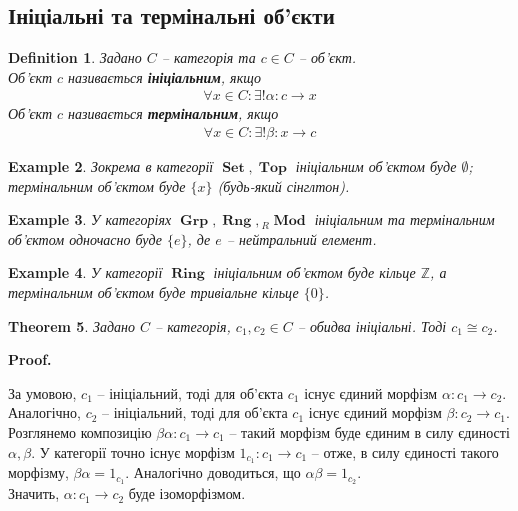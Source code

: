 \documentclass[a4paper, 10pt]{article}
\makeatletter
\theoremstyle{theoremdd}
\newtheorem{theorem}{Theorem}[subsection]
\newtheorem{definition}[theorem]{Definition}
\newtheorem{example}[theorem]{Example}
\renewenvironment{proof}[1][Proof.\\]{\par
\pushQED{\hfill \qed}%
\normalfont \topsep6\p@\@plus6\p@\relax
\trivlist
\item\relax
{\bfseries
#1\@addpunct{.}}\hspace\labelsep\ignorespaces
}{%
\popQED\endtrivlist\@endpefalse
}
\DeclareMathOperator{\Set}{\textbf{Set}}
\DeclareMathOperator{\Grp}{\textbf{Grp}}
\DeclareMathOperator{\Ring}{\textbf{Ring}}
\DeclareMathOperator{\Rng}{\textbf{Rng}}
\DeclareMathOperator{\Top}{\textbf{Top}}
\DeclareMathOperator{\Mod}{\textbf{Mod}}
\makeatother
\begin{document}
\subsection{Ініціальні та термінальні об'єкти}
\begin{definition}
Задано $C$ -- категорія та $c \in C$ -- об'єкт.\\
Об'єкт $c$ називається \textbf{ініціальним}, якщо
\begin{align*}
\forall x \in C: \exists ! \alpha \colon c \to x
\end{align*}
Об'єкт $c$ називається \textbf{термінальним}, якщо
\begin{align*}
\forall x \in C: \exists! \beta \colon x \to c
\end{align*}
\end{definition}

\begin{example}
Зокрема в категорії $\Set, \Top$ ініціальним об'єктом буде $\emptyset$; термінальним об'єктом буде $\{x\}$ (будь-який сінглтон).
\end{example}

\begin{example}
У категоріях $\Grp, \Rng, {}_{R}\Mod$ ініціальним та термінальним об'єктом одночасно буде $\{e\}$, де $e$ -- нейтральний елемент.
\end{example}

\begin{example}
У категорії $\Ring$ ініціальним об'єктом буде кільце $\mathbb{Z}$, а термінальним об'єктом буде тривіальне кільце $\{0\}$.
\end{example}

\begin{theorem}
Задано $C$ -- категорія, $c_1,c_2 \in C$ -- обидва ініціальні. Тоді $c_1 \cong c_2$.
\end{theorem}

\begin{proof}
За умовою, $c_1$ -- ініціальний, тоді для об'єкта $c_1$ існує єдиний морфізм $\alpha \colon c_1 \to c_2$. Аналогічно, $c_2$ -- ініціальний, тоді для об'єкта $c_1$ існує єдиний морфізм $\beta \colon c_2 \to c_1$. Розглянемо композицію $\beta \alpha \colon c_1 \to c_1$ -- такий морфізм буде єдиним в силу єдиності $\alpha,\beta$. У категорії точно існує морфізм $1_{c_1} \colon c_1 \to c_1$ -- отже, в силу єдиності такого морфізму, $\beta \alpha = 1_{c_1}$. Аналогічно доводиться, що $\alpha \beta = 1_{c_2}$.\\
Значить, $\alpha \colon c_1 \to c_2$ буде ізоморфізмом.
\end{proof}
\end{document}
